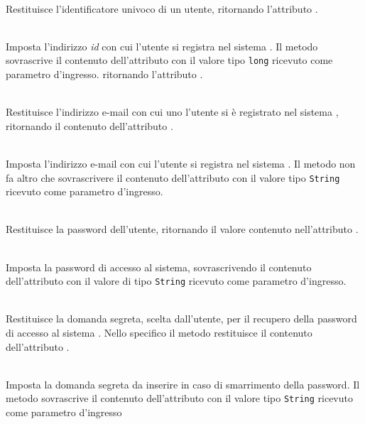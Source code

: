 \begin{description}
	\item{}\\
	Restituisce l'identificatore univoco di un utente, ritornando l'attributo .
	\item{}\\
	Imposta l'indirizzo \textit{id} con cui l'utente si registra nel sistema \caName. Il metodo sovrascrive il contenuto dell'attributo  con il valore tipo \texttt{long} ricevuto come parametro d'ingresso. ritornando l'attributo .
	\item{}\\
	Restituisce l'indirizzo e-mail con cui uno l'utente si è registrato nel sistema \caName, ritornando il contenuto dell'attributo .
	\item{}\\ 
	Imposta l'indirizzo e-mail con cui l'utente si registra nel sistema \caName. Il metodo non fa altro che sovrascrivere il contenuto dell'attributo  con il valore tipo \texttt{String} ricevuto come parametro d'ingresso.
	\item{}\\
	Restituisce la password dell'utente, ritornando il valore contenuto nell'attributo .
	\item{}\\
	Imposta la password di accesso al sistema, sovrascrivendo il contenuto dell'attributo  con il valore di tipo \texttt{String} ricevuto come parametro d'ingresso.
	\item{}\\
	Restituisce la domanda segreta, scelta dall'utente, per il recupero della password di accesso al sistema \caName. Nello specifico il metodo restituisce il contenuto dell'attributo .
	\item{}\\
	Imposta la domanda segreta da inserire in caso di smarrimento della password. Il metodo sovrascrive il contenuto dell'attributo  con il valore tipo \texttt{String} ricevuto come parametro d'ingresso
	\item{}\\

\end{description}
